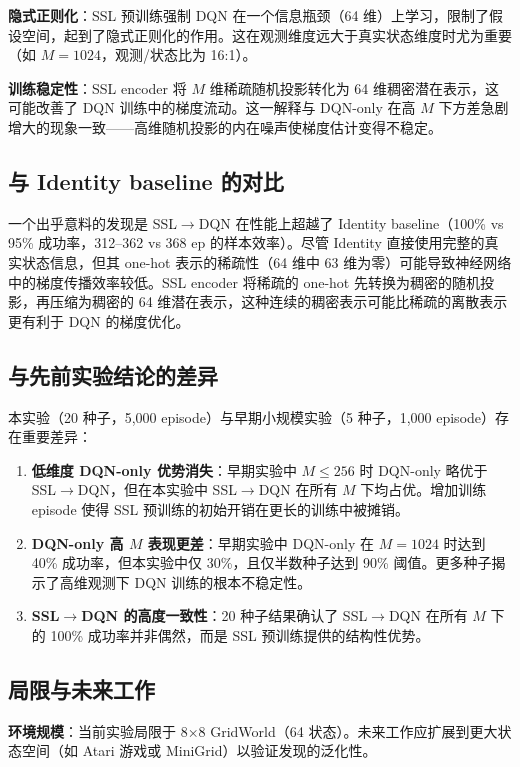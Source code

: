 \documentclass[11pt,a4paper]{ctexart}
\begin{document}
\textbf{隐式正则化}：SSL 预训练强制 DQN 在一个信息瓶颈（64 维）上学习，限制了假设空间，起到了隐式正则化的作用。这在观测维度远大于真实状态维度时尤为重要（如 $M=1024$，观测/状态比为 16:1）。

\textbf{训练稳定性}：SSL encoder 将 $M$ 维稀疏随机投影转化为 64 维稠密潜在表示，这可能改善了 DQN 训练中的梯度流动。这一解释与 DQN-only 在高 $M$ 下方差急剧增大的现象一致——高维随机投影的内在噪声使梯度估计变得不稳定。

\subsection{与 Identity baseline 的对比}

一个出乎意料的发现是 SSL$\to$DQN 在性能上超越了 Identity baseline（100\% vs 95\% 成功率，312--362 vs 368 ep 的样本效率）。尽管 Identity 直接使用完整的真实状态信息，但其 one-hot 表示的稀疏性（64 维中 63 维为零）可能导致神经网络中的梯度传播效率较低。SSL encoder 将稀疏的 one-hot 先转换为稠密的随机投影，再压缩为稠密的 64 维潜在表示，这种连续的稠密表示可能比稀疏的离散表示更有利于 DQN 的梯度优化。

\subsection{与先前实验结论的差异}

本实验（20 种子，5,000 episode）与早期小规模实验（5 种子，1,000 episode）存在重要差异：

\begin{enumerate}
\item \textbf{低维度 DQN-only 优势消失}：早期实验中 $M \leq 256$ 时 DQN-only 略优于 SSL$\to$DQN，但在本实验中 SSL$\to$DQN 在所有 $M$ 下均占优。增加训练 episode 使得 SSL 预训练的初始开销在更长的训练中被摊销。
\item \textbf{DQN-only 高 $M$ 表现更差}：早期实验中 DQN-only 在 $M=1024$ 时达到 40\% 成功率，但本实验中仅 30\%，且仅半数种子达到 90\% 阈值。更多种子揭示了高维观测下 DQN 训练的根本不稳定性。
\item \textbf{SSL$\to$DQN 的高度一致性}：20 种子结果确认了 SSL$\to$DQN 在所有 $M$ 下的 100\% 成功率并非偶然，而是 SSL 预训练提供的结构性优势。
\end{enumerate}

\subsection{局限与未来工作}

\textbf{环境规模}：当前实验局限于 8×8 GridWorld（64 状态）。未来工作应扩展到更大状态空间（如 Atari 游戏或 MiniGrid）以验证发现的泛化性。
\end{document}
